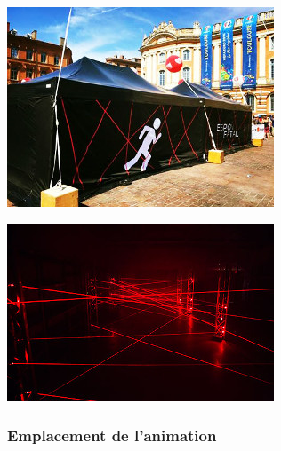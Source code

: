 \documentclass[hidelinks, paper=a4, fontsize=13pt]{report}
\begin{document}
\begin{center}
\includegraphics[scale=1,keepaspectratio]{Annexes/Images/espion_fatal}


\includegraphics[scale=1,keepaspectratio]{Annexes/Images/espion_fatal_interieur}
\end{center}

\subsubsection{Emplacement de l’animation}
\end{document}
